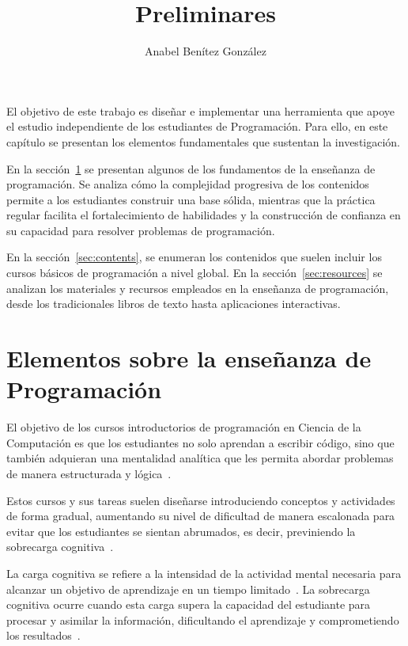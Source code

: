 \documentclass{article}
\title{Preliminares}
\author{Anabel Benítez González}
\date{}
\begin{document}
\tableofcontents 

\maketitle

El objetivo de este trabajo es diseñar e implementar una herramienta que apoye el estudio independiente de los estudiantes de Programación. Para ello, en este capítulo se presentan los elementos fundamentales que sustentan la investigación.

En la sección~\ref{sec:ensenanza_programacion} se presentan algunos de los fundamentos de la enseñanza de programación. Se analiza cómo la complejidad progresiva de los contenidos permite a los estudiantes construir una base sólida, mientras que la práctica regular facilita el fortalecimiento de habilidades y la construcción de confianza en su capacidad para resolver problemas de programación.

En la sección~\ref{sec:contents}, se enumeran los contenidos que suelen incluir los cursos básicos de programación a nivel global. En la sección~\ref{sec:resources} se analizan los materiales y recursos empleados en la enseñanza de programación, desde los tradicionales libros de texto hasta aplicaciones interactivas.

\section{Elementos sobre la enseñanza de Programación}\label{sec:ensenanza_programacion}

El objetivo de los cursos introductorios de programación en Ciencia de la Computación es que los estudiantes no solo aprendan a escribir código, sino que también adquieran una mentalidad analítica que les permita abordar problemas de manera estructurada y lógica~\cite{JOHNLEMAY2021100056}. 


Estos cursos y sus tareas suelen diseñarse introduciendo conceptos y actividades de forma gradual, aumentando su nivel de dificultad de manera escalonada para evitar que los estudiantes se sientan abrumados, es decir, previniendo la sobrecarga cognitiva~\cite{duran2021clt}.

La carga cognitiva se refiere a la intensidad de la actividad mental necesaria para alcanzar un objetivo de aprendizaje en un tiempo limitado~\cite{duran2021clt}. La sobrecarga cognitiva ocurre cuando esta carga supera la capacidad del estudiante para procesar y asimilar la información, dificultando el aprendizaje y comprometiendo los resultados~\cite{duran2021clt}. 
\end{document}
